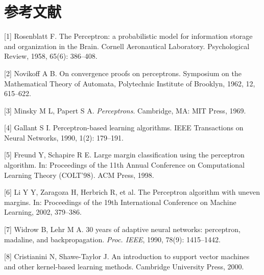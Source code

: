 \documentclass[UTF8, 12pt, fontset=fandol, oneside]{ctexart}
\begin{document}
\section*{参考文献}

[1] Rosenblatt F. The Perceptron: a probabilistic model for information storage and organization in the Brain. Cornell Aeronautical Laboratory. Psychological Review, 1958, 65(6): 386--408.

[2] Novikoff A B. On convergence proofs on perceptrons. Symposium on the Mathematical Theory of Automata, Polytechnic Institute of Brooklyn, 1962, 12, 615--622.

[3] Minsky M L, Papert S A. \textit{Perceptrons}. Cambridge, MA: MIT Press, 1969.

[4] Gallant S I. Perceptron-based learning algorithms. IEEE Transactions on Neural Networks, 1990, 1(2): 179--191.

[5] Freund Y, Schapire R E. Large margin classification using the perceptron algorithm. In: Proceedings of the 11th Annual Conference on Computational Learning Theory (COLT'98). ACM Press, 1998.

[6] Li Y Y, Zaragoza H, Herbrich R, et al. The Perceptron algorithm with uneven margins. In: Proceedings of the 19th International Conference on Machine Learning, 2002, 379--386.

[7] Widrow B, Lehr M A. 30 years of adaptive neural networks: perceptron, madaline, and backpropagation. \textit{Proc. IEEE}, 1990, 78(9): 1415--1442.

[8] Cristianini N, Shawe-Taylor J. An introduction to support vector machines and other kernel-based learning methods. Cambridge University Press, 2000.
\end{document}
